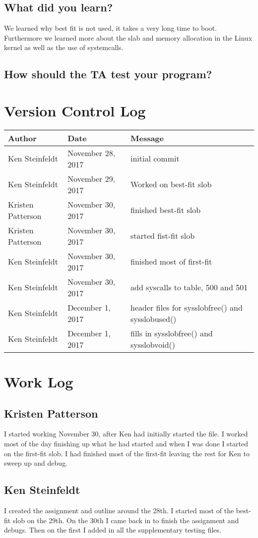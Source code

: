 \documentclass[10pt,letterpaper,onecolumn,draftclsnofoot]{IEEEtran}
\begin{document}
\subsection{What did you learn?}
We learned why best fit is not used, it takes a very long time to boot.
Furthermore we learned more about the slab and memory allocation in the Linux kernel as well as the use of systemcalls.

\subsection{How should the TA test your program?}

\section{Version Control Log}

\begin{center}
	\begin{tabular}{|l|l|l|}
		\hline
		\textbf{Author} & \textbf{Date} & \textbf{Message} \\ \hline
		Ken Steinfeldt & November 28, 2017 & initial commit \\ \hline
		Ken Steinfeldt & November 29, 2017 & Worked on best-fit slob \\ \hline
		Kristen Patterson & November 30, 2017 & finished best-fit slob \\ \hline
		Kristen Patterson & November 30, 2017 & started fist-fit slob \\ \hline
		Ken Steinfeldt & November 30, 2017 & finished most of first-fit \\ \hline
		Ken Steinfeldt & November 30, 2017 & add syscalls to table, 500 and 501 \\ \hline
		Ken Steinfeldt & December 1, 2017 & header files for sysslobfree() and sysslobused() \\ \hline
		Ken Steinfeldt & December 1, 2017 & fills in sysslobfree() and sysslobvoid() \\ \hline
	\end{tabular}
\end{center}

\section{Work Log}
\subsection{Kristen Patterson}
I started working November 30, after Ken had initially started the file.
I worked most of the day finishing up what he had started and when I was done I started on the first-fit slob.
I had finished most of the first-fit leaving the rest for Ken to sweep up and debug.

\subsection{Ken Steinfeldt}
I created the assignment and outline around the 28th.
I started most of the best-fit slob on the 29th.
On the 30th I came back in to finish the assignment and debugs.
Then on the first I added in all the supplementary testing files.
\end{document}
